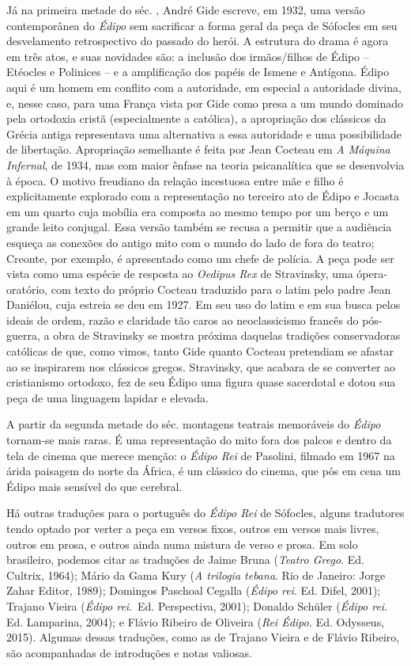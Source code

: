 Já na primeira metade do séc. , André Gide escreve, em 1932,
uma versão contemporânea do \emph{Édipo} sem sacrificar a forma geral da
peça de Sófocles em seu desvelamento retrospectivo do passado do herói.
A estrutura do drama é agora em três atos, e suas novidades são: a
inclusão dos irmãos/filhos de Édipo -- Etéocles e Polinices -- e a
amplificação dos papéis de Ismene e Antígona. Édipo aqui é um homem em
conflito com a autoridade, em especial a autoridade divina, e, nesse
caso, para uma França vista por Gide como presa a um mundo dominado pela
ortodoxia cristã (especialmente a católica), a apropriação dos clássicos
da Grécia antiga representava uma alternativa a essa autoridade e uma
possibilidade de libertação. Apropriação semelhante é feita por
Jean Cocteau em \emph{A Máquina Infernal}, de 1934, mas com
maior ênfase na teoria psicanalítica que se desenvolvia à época. O
motivo freudiano da relação incestuosa entre mãe e filho é
explicitamente explorado com a representação no terceiro ato de Édipo e
Jocasta em um quarto cuja mobília era composta ao mesmo tempo por um
berço e um grande leito conjugal. Essa versão também se recusa a
permitir que a audiência esqueça as conexões do antigo mito com o mundo
do lado de fora do teatro; Creonte, por exemplo, é apresentado como um
chefe de polícia. A peça pode ser vista como uma espécie de resposta ao
\emph{Oedipus Rex} de Stravinsky, uma ópera-oratório, com texto
do próprio Cocteau traduzido para o latim pelo padre Jean Daniélou, cuja
estreia se deu em 1927. Em seu uso do latim e em sua busca pelos ideais
de ordem, razão e claridade tão caros ao neoclassicismo francês do
pós-guerra, a obra de Stravinsky se mostra próxima daquelas tradições
conservadoras católicas de que, como vimos, tanto Gide quanto Cocteau
pretendiam se afastar ao se inspirarem nos clássicos gregos. Stravinsky,
que acabara de se converter ao cristianismo ortodoxo, fez de seu Édipo
uma figura quase sacerdotal e dotou sua peça de uma linguagem lapidar e
elevada.

A partir da segunda metade do séc.  montagens teatrais memoráveis do
\emph{Édipo} tornam-se mais raras. É uma representação do mito fora dos
palcos e dentro da tela de cinema que merece menção: o \emph{Édipo Rei}
de Pasolini, filmado em 1967 na árida paisagem do norte da
África, é um clássico do cinema, que pôs em cena um Édipo mais sensível
do que cerebral.

Há outras traduções para o português do \emph{Édipo Rei} de Sófocles,
alguns tradutores tendo optado por verter a peça em versos fixos, outros
em versos mais livres, outros em prosa, e outros ainda numa mistura de
verso e prosa. Em solo brasileiro, podemos citar as traduções de Jaime
Bruna (\emph{Teatro Grego}. Ed.
Cultrix, 1964); Mário
da Gama Kury (\emph{A trilogia tebana}. Rio de Janeiro: Jorge Zahar
Editor, 1989); Domingos Paschoal Cegalla (\emph{Édipo rei}. Ed. Difel,
2001); Trajano Vieira (\emph{Édipo rei}.~Ed. Perspectiva, 2001);
Donaldo Schüler (\emph{Édipo rei}. Ed.
Lamparina, 2004); e
Flávio Ribeiro de Oliveira (\emph{Rei Édipo.} Ed. Odysseus, 2015).
Algumas dessas traduções, como as de Trajano Vieira e de Flávio Ribeiro,
são acompanhadas de introduções e notas valiosas.

